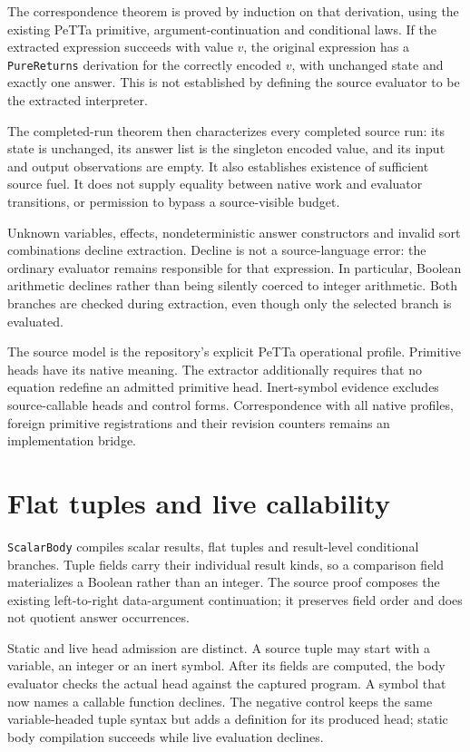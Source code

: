 \documentclass[11pt,a4paper]{article}
\newcommand{\code}[1]{\nolinkurl{#1}}
\begin{document}
The correspondence theorem is proved by induction on that derivation, using
the existing PeTTa primitive, argument-continuation and conditional laws. If
the extracted expression succeeds with value $v$, the original expression
has a \code{PureReturns} derivation for the correctly encoded $v$, with
unchanged state and exactly one answer. This is not established by defining
the source evaluator to be the extracted interpreter.

The completed-run theorem then characterizes every completed source run:
its state is unchanged, its answer list is the singleton encoded value, and
its input and output observations are empty. It also establishes existence
of sufficient source fuel. It does not supply equality between native work
and evaluator transitions, or permission to bypass a source-visible budget.

Unknown variables, effects, nondeterministic answer constructors and invalid
sort combinations decline extraction. Decline is not a source-language error:
the ordinary evaluator remains responsible for that expression. In particular,
Boolean arithmetic declines rather than being silently coerced to integer
arithmetic. Both branches are checked during extraction, even though only
the selected branch is evaluated.

The source model is the repository's explicit PeTTa operational profile.
Primitive heads have its native meaning. The extractor additionally requires
that no equation redefine an admitted primitive head. Inert-symbol evidence
excludes source-callable heads and control forms. Correspondence with all
native profiles, foreign primitive registrations and their revision counters
remains an implementation bridge.

\section{Flat tuples and live callability}

\code{ScalarBody} compiles scalar results, flat tuples and result-level
conditional branches. Tuple fields carry their individual result kinds, so
a comparison field materializes a Boolean rather than an integer. The
source proof composes the existing left-to-right data-argument continuation;
it preserves field order and does not quotient answer occurrences.

Static and live head admission are distinct. A source tuple may start with
a variable, an integer or an inert symbol. After its fields are computed, the
body evaluator checks the actual head against the captured program. A symbol
that now names a callable function declines. The negative control keeps the
same variable-headed tuple syntax but adds a definition for its produced
head; static body compilation succeeds while live evaluation declines.
\end{document}
